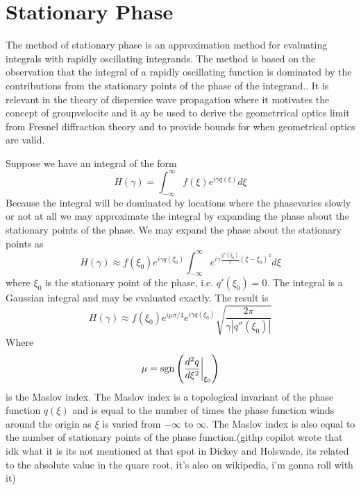 \documentclass[../../main.tex]{subfiles} %
\begin{document}
\section{Stationary Phase}
The method of stationary phase is an approximation method for evaluating integrals with rapidly oscillating integrands. The method is based on the observation that the integral of a rapidly oscillating function is dominated by the contributions from the stationary points of the phase of the integrand.. It is relevant in the theory of dispersice wave propagation where it motivates the concept of groupvelocite and it ay be used to derive the geometrrical optics limit from Fresnel diffraction theory and to provide bounds for when geometrical optics are valid.

Suppose we have an integral of the form
\begin{equation}
    H(\gamma)=\int_{-\infty}^\infty f(\xi)e^{i\gamma q(\xi)}d\xi
\end{equation}
Because the integral will be dominated by locations where the phasevaries slowly or not at all we may approximate the integral by expanding the phase about the stationary points of the phase. We may expand the phase about the stationary points as
\begin{equation}
    H(\gamma)\approx f(\xi_0)e^{i\gamma q(\xi_0)} \int_{-\infty}^\infty e^{i\gamma\frac{q''(\xi_0)}{2}(\xi-\xi_0)^2}d\xi
\end{equation}
where $\xi_0$ is the stationary point of the phase, i.e. $q'(\xi_0)=0$. The integral is a Gaussian integral and may be evaluated exactly. The result is
\begin{equation}
    H(\gamma)\approx f(\xi_0)e^{i\mu\pi/4}e^{i\gamma q(\xi_0)} \sqrt{\frac{2\pi}{\gamma|q''(\xi_0)|}}
\end{equation}
Where
\begin{equation}
    \mu=\operatorname{sgn}\left(\frac{d^2q}{d\xi^2}\bigg|_{\xi_0}\right)
\end{equation}
is the Maslov index. The Maslov index is a topological invariant of the phase function $q(\xi)$ and is equal to the number of times the phase function winds around the origin as $\xi$ is varied from $-\infty$ to $\infty$. The Maslov index is also equal to the number of stationary points of the phase function.(githp copilot wrote that idk what it is its not mentioned at that spot in Dickey and Holswade, its related to the absolute value in the quare root, it's also on wikipedia, i'm gonna roll with it)
\end{document}
